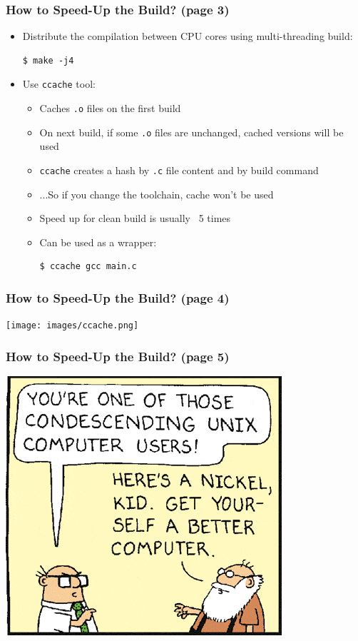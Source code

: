 \documentclass[aspectratio=169]{beamer}
\begin{document}
\begin{frame}[fragile]
  \frametitle{How to Speed-Up the Build? (page 3)}
  \begin{itemize}
    \item Distribute the compilation between CPU cores using multi-threading build:
    \begin{verbatim}
$ make -j4
    \end{verbatim}
    \item Use \texttt{ccache} tool:
    \begin{itemize}
      \item Caches \texttt{.o} files on the first build
      \item On next build, if some \texttt{.o} files are unchanged, cached
            versions will be used
      \item \texttt{ccache} creates a hash by \texttt{.c} file content and by
            build command
      \item ...So if you change the toolchain, cache won't be used
      \item Speed up for clean build is usually ~5 times
      \item Can be used as a wrapper:
      \begin{verbatim}
$ ccache gcc main.c
      \end{verbatim}
    \end{itemize}
  \end{itemize}
\end{frame}

\begin{frame}
  \frametitle{How to Speed-Up the Build? (page 4)}
  \begin{center}
    \texttt{[image: images/ccache.png]}
  \end{center}
  \vspace*{-10mm}
\end{frame}

\begin{frame}
  \frametitle{How to Speed-Up the Build? (page 5)}
  \begin{center}
    \includegraphics[scale=0.55]{images/nickel.png}
  \end{center}
\end{frame}
\end{document}
